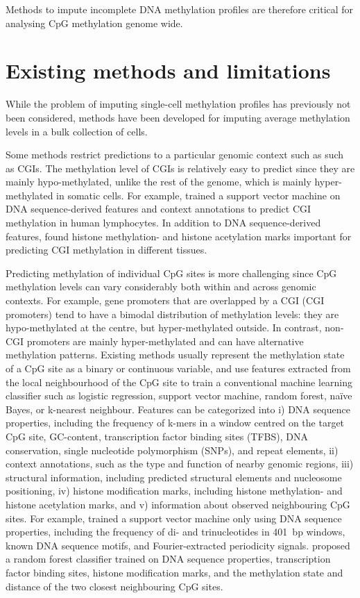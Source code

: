 Methods to impute incomplete DNA methylation profiles are therefore critical for analysing CpG methylation genome wide.


\section{Existing methods and limitations}

While the problem of imputing single-cell methylation profiles has previously not been considered, methods have been developed for imputing average methylation levels in a bulk collection of cells.

Some methods restrict predictions to a particular genomic context such as such as CGIs. The methylation level of CGIs is relatively easy to predict since they are mainly hypo-methylated, unlike the rest of the genome, which is mainly hyper-methylated in somatic cells. For example, \citet{bock_cpg_2006} trained a support vector machine on DNA sequence-derived features and context annotations to predict CGI methylation in human lymphocytes. In addition to DNA sequence-derived features, \citet{zheng_cpgimethpred:_2013} found histone methylation- and histone acetylation marks important for predicting CGI methylation in different tissues.

Predicting methylation of individual CpG sites is more challenging since CpG methylation levels can vary considerably both within and across genomic contexts. For example, gene promoters that are overlapped by a CGI (CGI promoters) tend to have a bimodal distribution of methylation levels: they are hypo-methylated at the centre, but hyper-methylated outside. In contrast, non-CGI promoters are mainly hyper-methylated and can have alternative methylation patterns. Existing methods usually represent the methylation state of a CpG site as a binary or continuous variable, and use features extracted from the local neighbourhood of the CpG site to train a conventional machine learning classifier such as logistic regression, support vector machine, random forest, naïve Bayes, or k-nearest neighbour. Features can be categorized into i) DNA sequence properties, including the frequency of k-mers in a window centred on the target CpG site, GC-content, transcription factor binding sites (TFBS), DNA conservation, single nucleotide polymorphism (SNPs), and repeat elements, ii) context annotations, such as the type and function of nearby genomic regions, iii) structural information, including predicted structural elements and nucleosome positioning, iv) histone modification marks, including histone methylation- and histone acetylation marks, and v) information about observed neighbouring CpG sites. For example, \citet{malousi_predictive_2014} trained a support vector machine only using DNA sequence properties, including the frequency of di- and trinucleotides in 401~bp windows, known DNA sequence motifs, and Fourier-extracted periodicity signals. \citet{zhang_predicting_2015} proposed a random forest classifier trained on DNA sequence properties, transcription factor binding sites, histone modification marks, and the methylation state and distance of the two closest neighbouring CpG sites.

